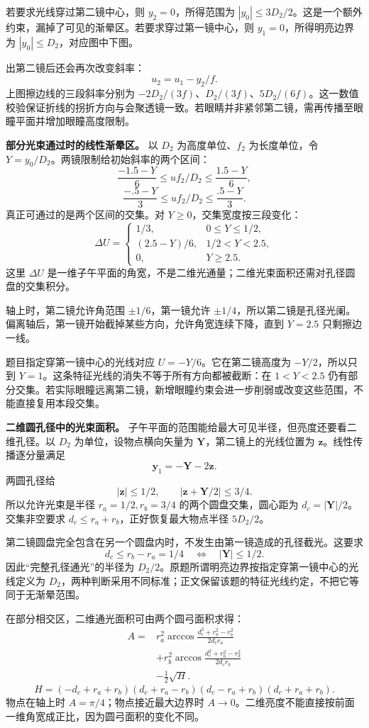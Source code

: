 \documentclass[12pt,a4paper,UTF8]{ctexart}
\begin{document}
若要求光线穿过第二镜中心，则 \(y_2=0\)，所得范围为
\(|y_0|\le3D_2/2\)。这是一个额外约束，漏掉了可见的渐晕区。若要求穿过第一镜中心，则
\(y_1=0\)，所得明亮边界为 \(|y_0|\le D_2\)，对应图中下图。

出第二镜后还会再次改变斜率： \[
u_2=u_1-y_2/f.
\] 上图擦边线的三段斜率分别为
\(-2D_2/(3f)\)、\(D_2/(3f)\)、\(5D_2/(6f)\)。这一数值校验保证折线的拐折方向与会聚透镜一致。若眼睛并非紧邻第二镜，需再传播至眼瞳平面并增加眼瞳高度限制。

\textbf{部分光束通过时的线性渐晕区。} 以 \(D_2\) 为高度单位、\(f_2\)
为长度单位，令 \(Y=y_0/D_2\)。两镜限制给初始斜率的两个区间： \[
\frac{-1.5-Y}{6}\le uf_2/D_2\le\frac{1.5-Y}{6},
\] \[
\frac{-.5-Y}{3}\le uf_2/D_2\le\frac{.5-Y}{3}.
\] 真正可通过的是两个区间的交集。对 \(Y\ge0\)，交集宽度按三段变化： \[
\Delta U=\begin{cases}
1/3,&0\le Y\le1/2,\\
(2.5-Y)/6,&1/2<Y<2.5,\\
0,&Y\ge2.5.
\end{cases}
\] 这里 \(\Delta U\)
是一维子午平面的角宽，不是二维光通量；二维光束面积还需对孔径圆盘的交集积分。

轴上时，第二镜允许角范围 \(\pm1/6\)，第一镜允许
\(\pm1/4\)，所以第二镜是孔径光阑。偏离轴后，第一镜开始截掉某些方向，允许角宽连续下降，直到
\(Y=2.5\) 只剩擦边一线。

题目指定穿第一镜中心的光线对应 \(U=-Y/6\)。它在第二镜高度为
\(-Y/2\)，所以只到 \(Y=1\)。这条特征光线的消失不等于所有方向都被截断：在
\(1<Y<2.5\)
仍有部分交集。若实际眼瞳远离第二镜，新增眼瞳约束会进一步削弱或改变这些范围，不能直接复用本段交集。

\textbf{二维圆孔径中的光束面积。}
子午平面的范围能给最大可见半径，但亮度还要看二维孔径。以 \(D_2\)
为单位，设物点横向矢量为 \(\bm Y\)，第二镜上的光线位置为
\(\bm z\)。线性传播逐分量满足 \[
\bm y_1=-\bm Y-2\bm z.
\] 两圆孔径给 \[
|\bm z|\le1/2,
\qquad |\bm z+\bm Y/2|\le3/4.
\] 所以允许光束是半径 \(r_a=1/2,r_b=3/4\) 的两个圆盘交集，圆心距为
\(d_c=|\bm Y|/2\)。交集非空要求 \(d_c\le r_a+r_b\)，正好恢复最大物点半径
\(5D_2/2\)。

第二镜圆盘完全包含在另一个圆盘内时，不发生由第一镜造成的孔径截光。这要求
\[
d_c\le r_b-r_a=1/4\quad\Longleftrightarrow\quad |\bm Y|\le1/2.
\] 因此``完整孔径通光''的半径为
\(D_2/2\)。原题所谓明亮边界按指定穿第一镜中心的光线定义为
\(D_2\)，两种判断采用不同标准；正文保留该题的特征光线约定，不把它等同于无渐晕范围。

在部分相交区，二维通光面积可由两个圆弓面积求得： \[
\begin{aligned}
A={}&r_a^2\arccos\frac{d_c^2+r_a^2-r_b^2}{2d_cr_a}
\\
&+r_b^2\arccos\frac{d_c^2+r_b^2-r_a^2}{2d_cr_b}
\\
&-\frac12\sqrt{H}.
\end{aligned}
\] \[
H=(-d_c+r_a+r_b)(d_c+r_a-r_b)
(d_c-r_a+r_b)(d_c+r_a+r_b).
\] 物点在轴上时 \(A=\pi/4\)；物点接近最大边界时
\(A\to0\)。二维亮度不能直接按前面一维角宽成正比，因为圆弓面积的变化不同。
\end{document}
